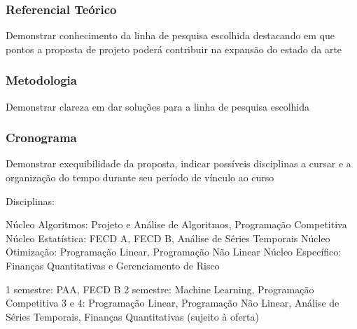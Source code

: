 \documentclass[a4paper, 12pt]{article}
\begin{document}
\subsubsection*{Referencial Teórico}

Demonstrar conhecimento da linha de pesquisa escolhida destacando em que
pontos a proposta de projeto poderá contribuir na expansão do estado da arte

\subsubsection*{Metodologia}

Demonstrar clareza em dar soluções para a linha de pesquisa escolhida

\subsubsection*{Cronograma}

Demonstrar exequibilidade da proposta, indicar possíveis disciplinas a cursar
e a organização do tempo durante seu período de vínculo ao curso

Disciplinas:

Núcleo Algoritmos: Projeto e Análise de Algoritmos, Programação Competitiva
Núcleo Estatística: FECD A, FECD B, Análise de Séries Temporais
Núcleo Otimização: Programação Linear, Programação Não Linear
Núcleo Específico: Finanças Quantitativas e Gerenciamento de Risco

1 semestre: PAA, FECD B
2 semestre: Machine Learning, Programação Competitiva
3 e 4: Programação Linear, Programação Não Linear, Análise de Séries Temporais,
Finanças Quantitativas (sujeito à oferta)




\end{document}
